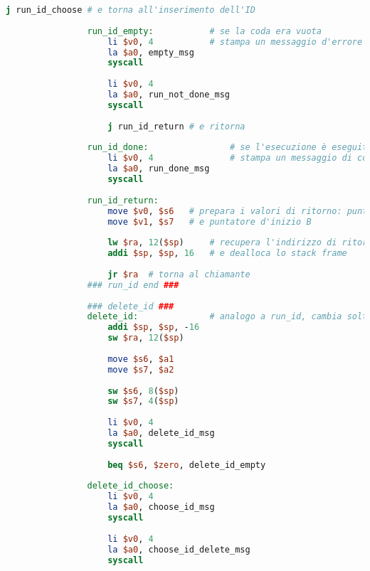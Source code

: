 \begin{center}
\begin{lstlisting}[language=mips, gobble=14, stepnumber=1]
                    j run_id_choose # e torna all'inserimento dell'ID
                    
                run_id_empty:           # se la coda era vuota
                    li $v0, 4           # stampa un messaggio d'errore
                    la $a0, empty_msg
                    syscall
                    
                    li $v0, 4
                    la $a0, run_not_done_msg
                    syscall
                    
                    j run_id_return # e ritorna
                    
                run_id_done:                # se l'esecuzione è eseguita con successo
                    li $v0, 4               # stampa un messaggio di corretta terminazione
                    la $a0, run_done_msg
                    syscall
                
                run_id_return:
                    move $v0, $s6   # prepara i valori di ritorno: puntatore d'inizio A
                    move $v1, $s7   # e puntatore d'inizio B
                    
                    lw $ra, 12($sp)     # recupera l'indirizzo di ritorno dallo stack
                    addi $sp, $sp, 16   # e dealloca lo stack frame
                    
                    jr $ra  # torna al chiamante
                ### run_id end ###
                
                ### delete_id ###
                delete_id:              # analogo a run_id, cambia soltanto la parte centrale
                    addi $sp, $sp, -16
                    sw $ra, 12($sp)
                
                    move $s6, $a1
                    move $s7, $a2
                    
                    sw $s6, 8($sp)
                    sw $s7, 4($sp)
                
                    li $v0, 4
                    la $a0, delete_id_msg
                    syscall
                    
                    beq $s6, $zero, delete_id_empty
                    
                delete_id_choose:
                    li $v0, 4
                    la $a0, choose_id_msg
                    syscall
                    
                    li $v0, 4
                    la $a0, choose_id_delete_msg
                    syscall
                    

\end{lstlisting}
\end{center}
